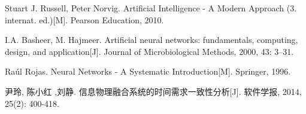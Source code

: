 \begin{thebibliography}{zz}
Stuart J. Russell, Peter Norvig. Artificial Intelligence - A Modern Approach (3. internat. ed.)[M]. Pearson Education, 2010.

I.A. Basheer, M. Hajmeer. Artificial neural networks: fundamentals, computing, design, and application[J]. Journal of Microbiological Methods, 2000, 43: 3–31.

Raúl Rojas. Neural Networks - A Systematic Introduction[M]. Springer, 1996.



尹玲, 陈小红 ,刘静. 信息物理融合系统的时间需求一致性分析[J]. 软件学报, 2014, 25(2): 400-418.



\end{thebibliography}

